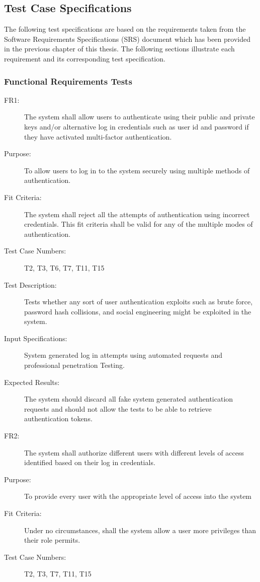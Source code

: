 \documentclass[a4paper,twoside,phd]{BYUPhys}
\begin{document}
\subsection{Test Case Specifications}
The following test specifications are based on the requirements taken from the Software Requirements Specifications (SRS) document which has been provided in the previous chapter of this thesis. The following sections illustrate each requirement and its corresponding test specification. 
\subsubsection{Functional Requirements Tests}
\begin{description}
\item[FR1:] The system shall allow users to authenticate using their public and private keys and/or alternative log in credentials such as user id and password if they have activated multi-factor authentication.
\item[Purpose:] To allow users to log in to the system securely using multiple methods of authentication.
\item[Fit Criteria:] The system shall reject all the attempts of authentication using incorrect credentials. This fit criteria shall be valid for any of the multiple modes of authentication.
\item[Test Case Numbers:] T2, T3, T6, T7, T11, T15
\item[Test Description:] Tests whether any sort of user authentication exploits such as brute force, password hash collisions, and social engineering might be exploited in the system.
\item[Input Specifications:] System generated log in attempts using automated requests and professional penetration Testing.
\item[Expected Results:] The system should discard all fake system generated authentication requests and should not allow the tests to be able to retrieve authentication tokens.
\\
\item[FR2:] The  system  shall  authorize  different  users  with  different  levels  of access identified based on their log in credentials.
\item[Purpose:] To provide every user with the appropriate level of access into the system 
\item[Fit Criteria:] Under no circumstances, shall the system allow a user more privileges than their role permits.
\item[Test Case Numbers:] T2, T3, T7, T11, T15

\end{description}
\end{document}
